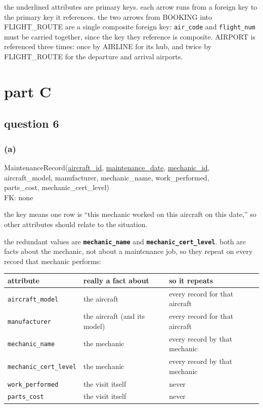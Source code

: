 \documentclass[12pt]{article}
\newcommand{\schema}[1]{%
  \begin{center}%
  \setlength{\fboxsep}{8pt}%
  \colorbox{gray!10}{%
    \begin{minipage}{0.93\linewidth}\ttfamily\small\raggedright #1\end{minipage}}%
  \end{center}%
}
\begin{document}
the underlined attributes are primary keys. each arrow runs from a foreign key to
the primary key it references. the two arrows from BOOKING into FLIGHT\_ROUTE
are a single composite foreign key: \texttt{air\_code} and
\texttt{flight\_num} must be carried together, since the key they reference is
composite. AIRPORT is referenced three times: once by AIRLINE for its hub, and
twice by FLIGHT\_ROUTE for the departure and arrival airports.

\newpage

\section*{part C}

\subsection*{question 6}

\subsubsection*{(a)}

\schema{
MaintenanceRecord(\underline{aircraft\_id}, \underline{maintenance\_date},
\underline{mechanic\_id},\\
\hspace*{2em}aircraft\_model, manufacturer, mechanic\_name, work\_performed,\\
\hspace*{2em}parts\_cost, mechanic\_cert\_level)\\[4pt]
FK: none
}

the key means one row is ``this mechanic worked on this aircraft on this
date,'' so other attributes should relate to the situation.

the redundant
values are \textbf{\texttt{mechanic\_name}} and
\textbf{\texttt{mechanic\_cert\_level}}. both are facts about the mechanic, not
about a maintenance job, so they repeat on every record that mechanic performs:

\begin{table}[H]
\centering
\begin{tabular}{|l|l|l|}
\hline
\textbf{attribute} & \textbf{really a fact about} & \textbf{so it repeats} \\
\hline
\texttt{aircraft\_model} & the aircraft & every record for that aircraft \\
\texttt{manufacturer} & the aircraft (and its model) & every record for that aircraft \\
\texttt{mechanic\_name} & the mechanic & every record by that mechanic \\
\texttt{mechanic\_cert\_level} & the mechanic & every record by that mechanic \\
\texttt{work\_performed} & the visit itself & never \\
\texttt{parts\_cost} & the visit itself & never \\
\hline
\end{tabular}
\end{table}
\end{document}
